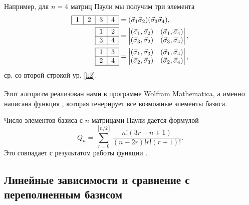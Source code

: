 \documentclass[]{article}
\renewcommand{\[}{\begin{equation}}
\renewcommand{\]}{\end{equation}}
\begin{document}
Например, для $n=4$ матриц Паули мы получим три элемента
\begin{align}
\begin{tabular}{ |l|l|l|l| }
\hline
1 & 2 & 3 & 4 \\
\hline
\end{tabular} & = ({\vec \sigma}_1{\vec\sigma}_2)({\vec \sigma}_3{\vec\sigma}_4), \nonumber
\\
%	
\begin{tabular}{ |l|l| }
\hline
1 & 2 \\ \hline
3 & 4 \\
\hline
\end{tabular} &
=\begin{vmatrix}
(\vec\sigma_1,\vec\sigma_2) & (\vec\sigma_1,\vec\sigma_4)\\
(\vec\sigma_3,\vec\sigma_2) & (\vec\sigma_3,\vec\sigma_4)\\
\end{vmatrix}, \nonumber
\\
%
\begin{tabular}{ |l|l| }
\hline
1 & 3 \\ \hline
2 & 4 \\
\hline
\end{tabular} &
=\begin{vmatrix}
(\vec\sigma_1,\vec\sigma_3) & (\vec\sigma_1,\vec\sigma_4)\\
(\vec\sigma_2,\vec\sigma_3) & (\vec\sigma_2,\vec\sigma_4)\\
\end{vmatrix},
\label{example4}
\end{align}
ср. со второй строкой ур. \eqref{k2}.


Этот алгоритм реализован нами в программе Wolfram Mathematica\textsuperscript{\textcopyright}, а именно  написана функция  \cite{basis_gen_code}, которая генерирует все возможные элементы базиса.

Число элементов базиса с $n$ матрицами Паули дается формулой \cite{sourceArticle}
\[
Q_n = \sum_{r=0}^{[n/2]}\frac{n!(3r-n+1)}{(n-2r)!r!(r+1)!}.
\label{k9}
\]
Это совпадает с результатом работы функции \cite{basis_gen_code}.


\subsection{Линейные зависимости и сравнение с переполненным базисом}
\end{document}
